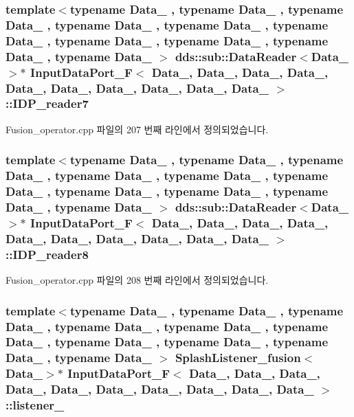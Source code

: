 \subsubsection[{\texorpdfstring{I\+D\+P\+\_\+reader7}{IDP_reader7}}]{\setlength{\rightskip}{0pt plus 5cm}template$<$typename Data\+\_ , typename Data\+\_ , typename Data\+\_ , typename Data\+\_ , typename Data\+\_ , typename Data\+\_ , typename Data\+\_ , typename Data\+\_ , typename Data\+\_ , typename Data\+\_ $>$ dds\+::sub\+::\+Data\+Reader$<$Data\+\_$>$$\ast$ {\bf Input\+Data\+Port\+\_\+F}$<$ Data\+\_, Data\+\_, Data\+\_, Data\+\_, Data\+\_, Data\+\_, Data\+\_, Data\+\_, Data\+\_, Data\+\_ $>$\+::I\+D\+P\+\_\+reader7}\hypertarget{classInputDataPort__F_ae04efc90dc8587b312b240d549399894}{}\label{classInputDataPort__F_ae04efc90dc8587b312b240d549399894}


Fusion\+\_\+operator.\+cpp 파일의 207 번째 라인에서 정의되었습니다.

\subsubsection[{\texorpdfstring{I\+D\+P\+\_\+reader8}{IDP_reader8}}]{\setlength{\rightskip}{0pt plus 5cm}template$<$typename Data\+\_ , typename Data\+\_ , typename Data\+\_ , typename Data\+\_ , typename Data\+\_ , typename Data\+\_ , typename Data\+\_ , typename Data\+\_ , typename Data\+\_ , typename Data\+\_ $>$ dds\+::sub\+::\+Data\+Reader$<$Data\+\_$>$$\ast$ {\bf Input\+Data\+Port\+\_\+F}$<$ Data\+\_, Data\+\_, Data\+\_, Data\+\_, Data\+\_, Data\+\_, Data\+\_, Data\+\_, Data\+\_, Data\+\_ $>$\+::I\+D\+P\+\_\+reader8}\hypertarget{classInputDataPort__F_a909a04c67500a9661ec84791b9739476}{}\label{classInputDataPort__F_a909a04c67500a9661ec84791b9739476}


Fusion\+\_\+operator.\+cpp 파일의 208 번째 라인에서 정의되었습니다.

\subsubsection[{\texorpdfstring{listener\+\_\+0}{listener_0}}]{\setlength{\rightskip}{0pt plus 5cm}template$<$typename Data\+\_ , typename Data\+\_ , typename Data\+\_ , typename Data\+\_ , typename Data\+\_ , typename Data\+\_ , typename Data\+\_ , typename Data\+\_ , typename Data\+\_ , typename Data\+\_ $>$ {\bf Splash\+Listener\+\_\+fusion}$<$Data\+\_$>$$\ast$ {\bf Input\+Data\+Port\+\_\+F}$<$ Data\+\_, Data\+\_, Data\+\_, Data\+\_, Data\+\_, Data\+\_, Data\+\_, Data\+\_, Data\+\_, Data\+\_ $>$\+::listener\+\_}\hypertarget{classInputDataPort__F_a1b73682b2bc71e7b9f85be1d6e5655da}{}\label{classInputDataPort__F_a1b73682b2bc71e7b9f85be1d6e5655da}


